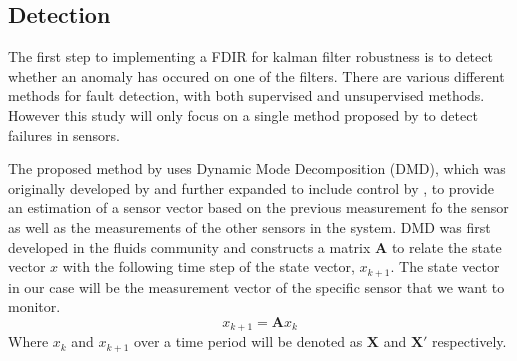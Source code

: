 \documentclass[letterpaper, 10 pt, conference]{ieeeconf}  %
\begin{document}
\subsection{Detection}
The first step to implementing a FDIR for kalman filter robustness is to detect whether an anomaly has occured on one of the filters. There are various different methods for fault detection, with both supervised and unsupervised methods. However this study will only focus on a single method proposed by \textcite{DeSilva2020} to detect failures in sensors.

The proposed method by \textcite{DeSilva2020} uses Dynamic Mode Decomposition (DMD), which was originally developed by \textcite{schmid2011applications} and further expanded to include control by \textcite{proctor2016dynamic}, to provide an estimation of a sensor vector based on the previous measurement fo the sensor as well as the measurements of the other sensors in the system. DMD was first developed in the fluids community and constructs a matrix $\mathbf{A}$ to relate the state vector $x$ with the following time step of the state vector, $x_{k+1}$. The state vector in our case will be the measurement vector of the specific sensor that we want to monitor.
\begin{equation}
	x_{k+1} = \mathbf{A}x_k
\end{equation}
Where $x_k$ and $x_{k+1}$ over a time period will be denoted as $\mathbf{X}$ and $\mathbf{X'}$ respectively.
\end{document}

